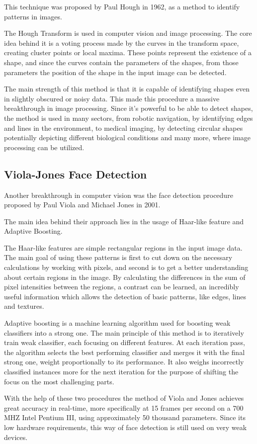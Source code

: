 \par This technique was proposed by Paul Hough in 1962, as a method to identify patterns in images. \cite{Duda1972}
\par The Hough Transform is used in computer vision and image processing. The core idea behind it is a voting process made by the curves in the transform space, creating cluster points or local maxima. These points represent the existence of a shape, and since the curves contain the parameters of the shapes, from those parameters the position of the shape in the input image can be detected. 
\par The main strength of this method is that it is capable of identifying shapes even in slightly obscured or noisy data. This made this procedure a massive breakthrough in image processing. Since it's powerful to be able to detect shapes, the method is used in many sectors, from robotic navigation, by identifying edges and lines in the environment, to medical imaging, by detecting circular shapes potentially depicting different biological conditions and many more, where image processing can be utilized.

\subsection{Viola-Jones Face Detection}
\label{subsec:ch2sec1subsec2}
\par Another breakthrough in computer vision was the face detection procedure proposed by Paul Viola and Michael Jones in 2001. \cite{viola2001}
\par The main idea behind their approach lies in the usage of Haar-like feature and Adaptive Boosting.
\par The Haar-like features are simple rectangular regions in the input image data. The main goal of using these patterns is first to cut down on the necessary calculations by working with pixels, and second is to get a better understanding about certain regions in the image. By calculating the differences in the sum of pixel intensities between the regions, a contrast can be learned, an incredibly useful information which allows the detection of basic patterns, like edges, lines and textures.
\par Adaptive boosting is a machine learning algorithm used for boosting weak classifiers into a strong one. The main principle of this method is to iteratively  train weak classifier, each focusing on different features. At each iteration pass, the algorithm selects the best performing classifier and merges it with the final strong one, weight proportionally to its performance. It also weighs incorrectly classified instances more for the next iteration for the purpose of shifting the focus on the most challenging parts.
\par With the help of these two procedures the method of Viola and Jones achieves great accuracy in real-time, more specifically at 15 frames per second on a 700 MHZ Intel Pentium III, using approximately 50 thousand parameters. Since its low hardware requirements, this way of face detection is still used on very weak devices.

